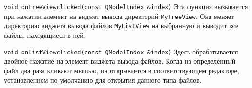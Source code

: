 \texttt{void on{\textunderscore}treeView{\textunderscore}clicked(const QModelIndex \&index)}
Эта функция вызывается при нажатии элемент на виджет вывода директорий \texttt{MyTreeView}.
Она меняет директорию виджета вывода файлов \texttt{MyListView} на выбранную и выводит все файлы, находящиеся в ней.



\texttt{void on{\textunderscore}listView{\textunderscore}clicked(const QModelIndex \&index)}
Здесь обрабатывается двойное нажатие на элемент виджета вывода файлов.
Когда на определенный файл два раза кликают мышью, он открывается в соответствующем редакторе, установленном по умолчанию для открытия данного типа файлов.

